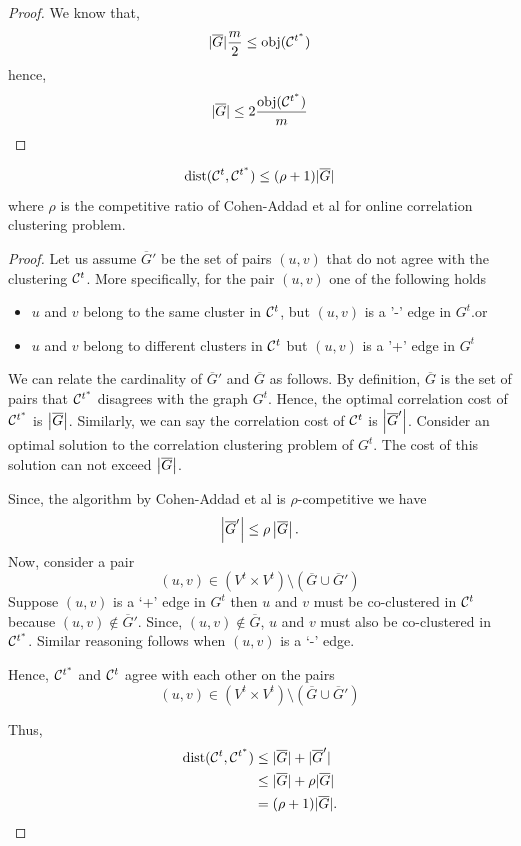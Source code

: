 \begin{proof}
    We know that, 
    \[
        |\overline{G}|\frac{m}{2} \leq \text{obj}(\mathcal{C}^{t^*})
    \]
    hence,
    \[
        |\overline{G}| \leq 2 \frac{\text{obj}(\mathcal{C}^{t^*}
        )}{m}
    \]
\end{proof}

\begin{claim}\label{clm:bounding-distance-to-opt}
    \[\text{dist}(\mathcal{C}^t, \mathcal{C}^{t^*}) \le  (\rho + 1)|\overline{G}| \] 
    where $\rho$ is the competitive ratio of Cohen-Addad et al \cite{cohen2022online} for online correlation clustering problem.
\end{claim}

\begin{proof}
    Let us assume $\overline{G}'$ be the set of pairs $(u,v)$ that do not agree with the clustering $\mathcal{C}^t$. More specifically, for the pair $(u,v)$ one of the following holds
    \begin{itemize}
       \item $u$ and $v$ belong to the same cluster in $\mathcal{C}^{t}$, but $(u,v)$ is a '-' edge in $G^t$.or
        \item $u$ and $v$ belong to different clusters in $\mathcal{C}^{t}$ but $(u,v)$ is a '+' edge in $G^t$
    \end{itemize}
    We can relate the cardinality of $ \overline{G}' $ and $ \overline{G} $ as follows. By definition, $ \overline{G} $ is the set of pairs that $ \mathcal{C}^{t^*} $ disagrees with the graph $ G^{t} $. Hence, the optimal correlation cost of $\mathcal{C}^{t^*}$ is $ \left| \overline{G} \right| $. Similarly, we can say the correlation cost of $\mathcal{C}^t$ is $\left| \overline{G}' \right|$. %
    Consider an optimal solution to the correlation clustering problem of $ G^{t} $. The cost of this solution can not exceed $ \left| \overline{G} \right| $.
    
    Since, the algorithm by Cohen-Addad et al \cite{cohen2022online} is $\rho$-competitive we have
    \[
        \left| \overline{G}' \right| \leq \rho \left| \overline{G} \right|.
    \]
    Now, consider a pair
    \[
        (u,v) \in (V^t \times V^t) \setminus (\overline{G} \cup \overline{G}')
    \]
    Suppose $(u,v)$ is a `+' edge in $G^t$ then $u$ and $v$ must be co-clustered in $\mathcal{C}^t$ because $(u, v) \notin \overline{G}'$. Since, $(u,v) \notin \overline{G}$, $u$ and $v$ must also be co-clustered in $\mathcal{C}^{t^*}$. Similar reasoning follows when $(u,v)$ is a `-' edge.

    Hence, $\mathcal{C}^{t^*}$ and $\mathcal{C}^{t}$ agree with each other on the pairs 
    \[
        (u,v) \in (V^t \times V^t) \setminus (\overline{G} \cup \overline{G}')
    \]
    
   Thus, 
   \begin{align} 
        \text{dist}(\mathcal{C}^t, \mathcal{C}^{t^*}) &\le |\overline{G}| + |\overline{G}'| \nonumber \\ 
        &\leq |\overline{G}| + \rho|\overline{G}| \nonumber \\ 
        &= (\rho + 1)|\overline{G}|. \nonumber
    \end{align}
\end{proof}

